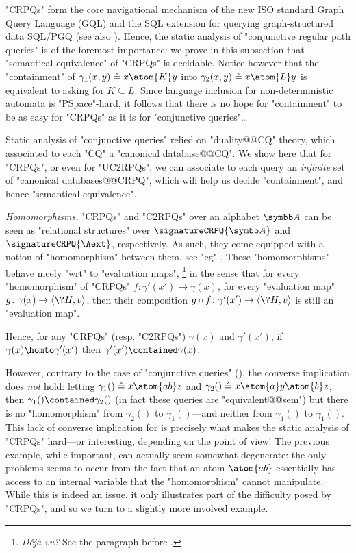 "CRPQs" form the core navigational mechanism of the new ISO standard Graph Query Language (GQL) \cite{ISO2024GQL} and the SQL extension for querying graph-structured data SQL/PGQ \cite{ISO2023PGQ} (see also \cite{FrancisEtal2023GQL,FrancisEtal2023GPC}).
Hence, the static analysis of "conjunctive regular path queries" is of the foremost
importance: we prove in this subsection that "semantical equivalence" of "CRPQs" is decidable.
Notice however that the "containment" of $\gamma_1(x,y) \defeq x \atom{K} y$
into $\gamma_2(x,y) \defeq x \atom{L} y$ is equivalent to asking for $K \subseteq L$.
Since language inclusion for non-deterministic automata is "PSpace"-hard, it follows
that there is no hope for "containment" to be as easy for "CRPQs" as it is for "conjunctive queries"…

Static analysis of "conjunctive queries" relied on "duality@@CQ" theory,
which associated to each "CQ" a "canonical database@@CQ". 
We show here that for "CRPQs", or even for "UC2RPQs", we can associate
to each query an \emph{infinite} set of "canonical databases@@CRPQ", which will help us
decide "containment", and hence "semantical equivalence".

\emph{Homomorphisms.} "CRPQs" and "C2RPQs" over an alphabet $\A$
can be seen as "relational structures" over $\signatureCRPQ{\A}$ and $\signatureCRPQ{\Aext}$,
respectively. As such, they come equipped with a notion of "homomorphism" between them,
see "eg" . These "homomorphisms" behave nicely "wrt" to "evaluation maps",%
\footnote{\emph{Déjà vu?} See the paragraph before .}
in the sense that for every "homomorphism" of "CRPQs" $f\colon \gamma'(\bar x') \to \gamma(\bar x)$,
for every "evaluation map" $g\colon \gamma(\bar x) \to \tup{\?H, \bar v}$,
then their composition $g \circ f\colon \gamma'(\bar x') \to \tup{\?H, \bar v}$
is still an "evaluation map".
\begin{fact}
    \label{fact:hom-implies-contained}
    Hence, for any "CRPQs" (resp. "C2RPQs") $\gamma(\bar x)$ and $\gamma'(\bar x')$,
    if $\gamma(\bar x) \homto \gamma'(\bar x')$ then $\gamma'(\bar x') \contained
    \gamma(\bar x)$.
\end{fact}
However, contrary to the case of "conjunctive queries" (),
the converse implication does \emph{not} hold: letting
$\gamma_1() \defeq x \atom{ab} z$ and $\gamma_2() \defeq x \atom{a} y \atom{b} z$,
then $\gamma_1() \contained \gamma_2()$ (in fact these queries are "equivalent@@sem")
but there is no "homomorphism" from $\gamma_2()$ to $\gamma_1()$---and neither
from $\gamma_1()$ to $\gamma_1()$.
This lack of converse implication for   is precisely what
makes the static analysis of "CRPQs" hard---or interesting, depending on the point of view!
The previous example, while important, can actually seem somewhat degenerate: the only problems
seems to occur from the fact that an atom $\atom{ab}$ essentially has access to an
internal variable that the "homomorphism" cannot manipulate.
While this is indeed an issue, it only illustrates part of the difficulty
posed by "CRPQs", and so we turn to a slightly more involved example.

